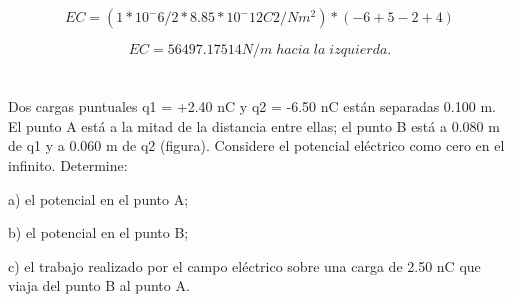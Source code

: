 \documentclass[12pt, letterpaper, twoside]{article}
\begin{document}
        \[ EC = ( 1*10^-6 /2*8.85 *10^-12 C2/Nm^2)* ( -6 + 5 - 2 + 4 ) \]

        \[ EC = 56497.17514 N/m\;hacia\;la\;izquierda. \]



    \section{}

    Dos cargas puntuales q1 = +2.40 nC y q2 = -6.50 nC están separadas 0.100 m. 
    El punto A está a la mitad de la distancia entre ellas; el punto B está a 0.080 m de q1 y a 0.060 m de q2 (figura). 
    Considere el potencial eléctrico como cero en el infinito. Determine:

    a) el potencial en el punto A;

    b) el potencial en el punto B;

    c) el trabajo realizado por el campo eléctrico sobre una carga de 2.50 nC que viaja del punto B al punto A.
\end{document}
